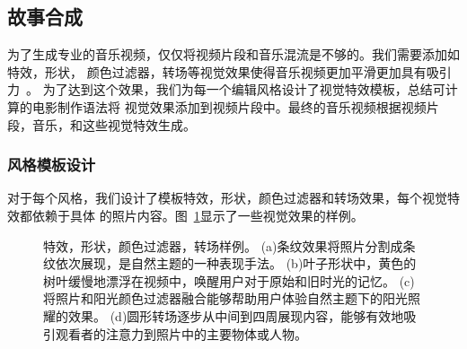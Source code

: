 \subsection{故事合成}
为了生成专业的音乐视频，仅仅将视频片段和音乐混流是不够的。我们需要添加如特效，形状，
颜色过滤器，转场等视觉效果使得音乐视频更加平滑更加具有吸引力~\cite{mei2007videosense}。
为了达到这个效果，我们为每一个编辑风格设计了视觉特效模板，总结可计算的电影制作语法将
视觉效果添加到视频片段中。最终的音乐视频根据视频片段，音乐，和这些视觉特效生成。

\subsubsection{风格模板设计}
对于每个风格，我们设计了模板特效，形状，颜色过滤器和转场效果，每个视觉特效都依赖于具体
的照片内容。图~\ref{fig:monet-shape_et_example}显示了一些视觉效果的样例。
\begin{figure}[ht]
    \centering
    \caption{特效，形状，颜色过滤器，转场样例。
        (a)条纹效果将照片分割成条纹依次展现，是自然主题的一种表现手法。
        (b)叶子形状中，黄色的树叶缓慢地漂浮在视频中，唤醒用户对于原始和旧时光的记忆。
        (c)将照片和阳光颜色过滤器融合能够帮助用户体验自然主题下的阳光照耀的效果。
        (d)圆形转场逐步从中间到四周展现内容，能够有效地吸引观看者的注意力到照片中的主要物体或人物。
    }
    \label{fig:monet-shape_et_example}
\end{figure}

